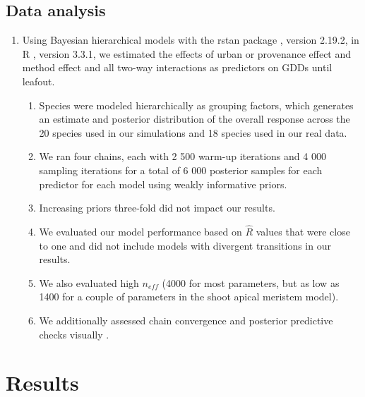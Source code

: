 \documentclass{article}\usepackage[]{graphicx}\usepackage[]{color}
\begin{document}
\subsection*{Data analysis}
\begin{enumerate}
\item Using Bayesian hierarchical models with the rstan package \citep{rstan2019}, version 2.19.2,  in R \citep{R}, version 3.3.1, we estimated the effects of urban or provenance effect and method effect and all two-way interactions as predictors on GDDs until leafout. 
  \begin{enumerate} 
  \item Species were modeled hierarchically as grouping factors, which generates an estimate and posterior distribution of the overall response across the 20 species used in our simulations and 18 species used in our real data.
  \item We ran four chains, each with 2 500 warm-up iterations and 4 000 sampling iterations for a total of 6 000 posterior samples for each predictor for each model using weakly informative priors.
  \item Increasing priors three-fold did not impact our results.
  \item We evaluated our model performance based on $\hat{R}$ values that were close to one and did not include models with divergent transitions in our results. 
  \item We also evaluated high $n_{eff}$ (4000 for most parameters, but as low as 1400 for a couple of parameters in the shoot apical meristem model). 
  \item We additionally assessed chain convergence and posterior predictive checks visually \citep{BDA}.
  \end{enumerate}
\end{enumerate}

\section*{Results}
\end{document}
